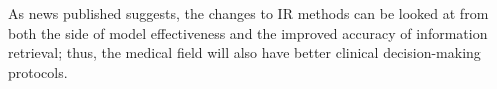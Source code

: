 \documentclass[conference]{IEEEtran}
\begin{document}
As news published suggests, the changes to IR methods can be looked at from both the side of model effectiveness and the improved accuracy of information retrieval; thus, the medical field will also have better clinical decision-making protocols.



\end{document}
